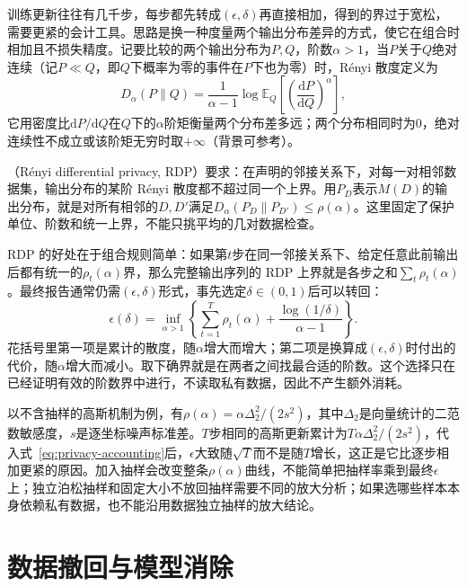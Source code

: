 训练更新往往有几千步，每步都先转成$(\epsilon,\delta)$再直接相加，得到的界过于宽松，需要更紧的会计工具。思路是换一种度量两个输出分布差异的方式，使它在组合时相加且不损失精度。记要比较的两个输出分布为$P,Q$，阶数$\alpha>1$，当$P$关于$Q$绝对连续（记$P\ll Q$，即$Q$下概率为零的事件在$P$下也为零）时，Rényi 散度定义为
\[
 D_\alpha(P\|Q)=\frac{1}{\alpha-1}\log\mathbb E_{Q}\left[\left(\frac{\mathrm dP}{\mathrm dQ}\right)^{\alpha}\right],
\]
它用密度比$\mathrm dP/\mathrm dQ$在$Q$下的$\alpha$阶矩衡量两个分布差多远；两个分布相同时为0，绝对连续性不成立或该阶矩无穷时取$+\infty$（背景可参考）。

（Rényi differential privacy, RDP）要求：在声明的邻接关系下，对每一对相邻数据集，输出分布的某阶 Rényi 散度都不超过同一个上界。用$P_D$表示$M(D)$的输出分布，就是对所有相邻的$D,D'$满足$D_\alpha(P_D\|P_{D'})\leq\rho(\alpha)$。这里固定了保护单位、阶数和统一上界，不能只挑平均的几对数据检查。

RDP 的好处在于组合规则简单：如果第$t$步在同一邻接关系下、给定任意此前输出后都有统一的$\rho_t(\alpha)$界，那么完整输出序列的 RDP 上界就是各步之和$\sum_t\rho_t(\alpha)$。最终报告通常仍需$(\epsilon,\delta)$形式，事先选定$\delta\in(0,1)$后可以转回：
\begin{equation}
 \epsilon(\delta)=
 \inf_{\alpha>1}\left\{
 \sum_{t=1}^{T}\rho_t(\alpha)
 +\frac{\log(1/\delta)}{\alpha-1}
 \right\}.
 \label{eq:privacy-accounting}
\end{equation}
花括号里第一项是累计的散度，随$\alpha$增大而增大；第二项是换算成$(\epsilon,\delta)$时付出的代价，随$\alpha$增大而减小。取下确界就是在两者之间找最合适的阶数。这个选择只在已经证明有效的阶数界中进行，不读取私有数据，因此不产生额外消耗。

以不含抽样的高斯机制为例，有$\rho(\alpha)=\alpha\Delta_2^2/(2s^2)$，其中$\Delta_2$是向量统计的二范数敏感度，$s$是逐坐标噪声标准差。$T$步相同的高斯更新累计为$T\alpha\Delta_2^2/(2s^2)$，代入式~\eqref{eq:privacy-accounting}后，$\epsilon$大致随$\sqrt{T}$而不是随$T$增长，这正是它比逐步相加更紧的原因。加入抽样会改变整条$\rho(\alpha)$曲线，不能简单把抽样率乘到最终$\epsilon$上；独立泊松抽样和固定大小不放回抽样需要不同的放大分析；如果选哪些样本本身依赖私有数据，也不能沿用数据独立抽样的放大结论。

\section{数据撤回与模型消除}
\label{sec:privacy-unlearning}

